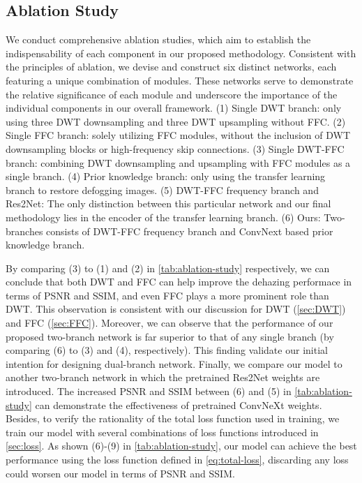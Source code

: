 \documentclass[10pt,twocolumn,letterpaper]{article}
\begin{document}
\subsection{Ablation Study}
\label{sec:ablation-study}
We conduct comprehensive ablation studies, which aim to establish the indispensability of each component in our proposed methodology. Consistent with the principles of ablation, we devise and construct six distinct networks, each featuring a unique combination of modules. These networks serve to demonstrate the relative significance of each module and underscore the importance of the individual components in our overall framework. (1) Single DWT branch: only using three DWT downsampling and three DWT upsampling without FFC. (2) Single FFC branch: solely utilizing FFC modules, without the inclusion of DWT downsampling blocks or high-frequency skip connections. (3) Single DWT-FFC branch: combining DWT downsampling and upsampling with FFC modules as a single branch. (4) Prior knowledge branch:  only using the transfer learning branch to restore defogging images. (5) DWT-FFC frequency branch and Res2Net: The only distinction between this particular network and our final methodology lies in the encoder of the transfer learning branch. (6) Ours: Two-branches consists of DWT-FFC frequency branch and ConvNext based prior knowledge branch. 

By comparing (3) to (1) and (2) in \cref{tab:ablation-study} respectively, we can conclude that both DWT and FFC can help improve the dehazing performace in terms of PSNR and SSIM, and even FFC plays a more prominent role than DWT. This observation is consistent with our discussion for DWT (\cref{sec:DWT}) and FFC (\cref{sec:FFC}). Moreover, we can observe that the performance of our proposed two-branch network is far superior to that of any single branch (by comparing (6) to (3) and (4), respectively). This finding validate our initial intention for designing dual-branch network. Finally, we compare our model to another two-branch network in which the pretrained Res2Net weights are introduced. The increased PSNR and SSIM between (6) and (5) in \cref{tab:ablation-study} can demonstrate the effectiveness of pretrained ConvNeXt weights. 
Besides, to verify the rationality of the total loss function used in training, we train our model with several combinations of loss functions introduced in \cref{sec:loss}. As shown (6)-(9) in \cref{tab:ablation-study}, our model can achieve the best performance using the loss function defined in \cref{eq:total-loss}, discarding any loss could worsen our model in terms of PSNR and SSIM.
\end{document}
